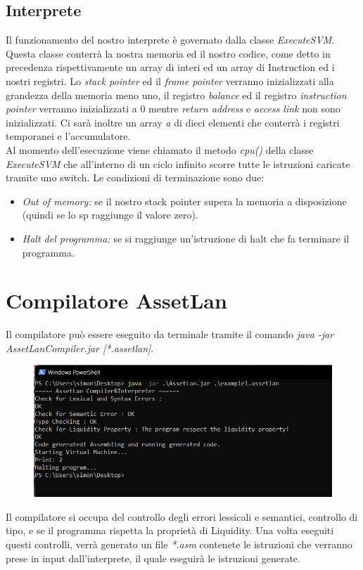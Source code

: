 \documentclass[12pt, a4paper]{report}
\begin{document}
\section{Interprete}
Il funzionamento del nostro interprete è governato dalla classe \emph{ExecuteSVM}. Questa classe conterrà la nostra memoria ed il nostro codice, come detto in precedenza rispettivamente un array di interi ed un array di Instruction ed i nostri registri. Lo \emph{stack pointer} ed il \emph{frame pointer} verranno inizializzati alla grandezza della memoria meno uno, il registro \emph{balance} ed il registro \emph{instruction pointer} verranno inizializzati a 0 mentre \emph{return address} e \emph{access link} non sono inizializzati. Ci sarà inoltre un array \emph{a} di dieci elementi che conterrà i registri temporanei e l'accumulatore. \\
Al momento dell'esecuzione viene chiamato il metodo \emph{cpu()} della classe \emph{ExecuteSVM} che all'interno di un ciclo infinito scorre tutte le istruzioni caricate tramite uno switch. Le condizioni di terminazione sono due:
\begin{itemize}
    \item \emph{Out of memory:} se il nostro stack pointer supera la memoria a disposizione (quindi se lo sp raggiunge il valore zero).
    \item \emph{Halt del programma:} se si raggiunge un'istruzione di halt che fa terminare il programma.
\end{itemize}

\chapter{Compilatore AssetLan}
Il compilatore può essere eseguito da terminale tramite il comando \textit{java -jar AssetLanCompiler.jar [*.assetlan]}.
\begin{figure}[H]
    \includegraphics[width=.9\textwidth]{jarGeneration.png}
\end{figure}
Il compilatore si occupa del controllo degli errori lessicali e semantici, controllo di tipo, e se il programma rispetta la proprietà di Liquidity. Una volta eseguiti questi controlli, verrà generato un file \textit{*.asm} contenete le istruzioni che verranno prese in input dall'interprete, il quale eseguirà le istruzioni generate.
\end{document}
